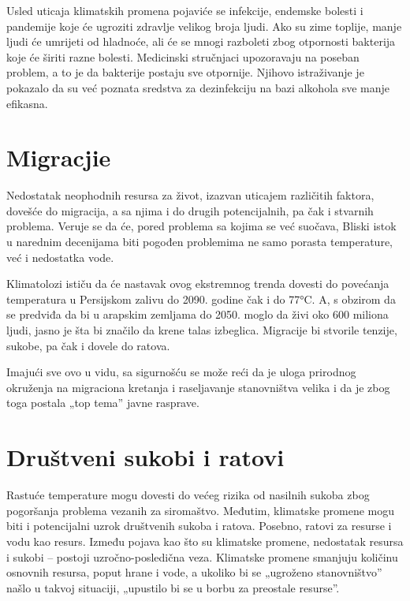 \documentclass[a4paper]{article}
\begin{document}
Usled uticaja klimatskih promena pojaviće se infekcije, endemske bolesti i pandemije koje će ugroziti zdravlje velikog broja ljudi. Ako su zime toplije, manje ljudi će umrijeti od hladnoće, ali će se
mnogi razboleti zbog otpornosti bakterija koje će širiti razne bolesti.
Medicinski stručnjaci upozoravaju na poseban problem, a to je da bakterije postaju sve otpornije.
Njihovo istraživanje je pokazalo da su već poznata sredstva za dezinfekciju na bazi alkohola sve manje efikasna.

\section{Migracjie}
\label{sec:migracije}

Nedostatak neophodnih resursa za život, izazvan uticajem različitih faktora, dovešće do migracija, a sa njima i do drugih potencijalnih, pa čak i stvarnih problema. 
Veruje se da će, pored problema sa kojima se već suočava, Bliski istok u narednim decenijama biti pogođen problemima ne samo porasta temperature, već i nedostatka vode.

Klimatolozi ističu da će nastavak ovog ekstremnog trenda dovesti do povećanja temperatura u Persijskom zalivu do 2090. godine čak i do 77°C. A, s obzirom da se predviđa da bi u arapskim zemljama do 2050. moglo da živi oko 600 miliona ljudi, jasno je šta bi značilo da krene talas izbeglica.
Migracije bi stvorile tenzije, sukobe, pa čak i dovele do ratova. 

Imajući sve ovo u vidu, sa sigurnošću se može reći da je uloga prirodnog okruženja na migraciona
kretanja i raseljavanje stanovništva velika i da je zbog toga postala „top tema” javne rasprave.



\section{Društveni sukobi i ratovi}
\label{sec:društveni_sukobi_i_ratovi}

Rastuće temperature mogu dovesti do većeg rizika od nasilnih sukoba zbog pogoršanja problema vezanih za siromaštvo. Međutim, klimatske promene mogu biti i potencijalni uzrok društvenih sukoba i ratova.
Posebno, ratovi za resurse i vodu kao resurs. Između pojava kao što su klimatske promene, nedostatak resursa i sukobi – postoji uzročno-posledična veza.
Klimatske promene smanjuju količinu osnovnih resursa, poput hrane i vode, a ukoliko bi se „ugroženo stanovništvo” našlo u takvoj situaciji, „upustilo bi se u borbu za preostale resurse”.
\end{document}
